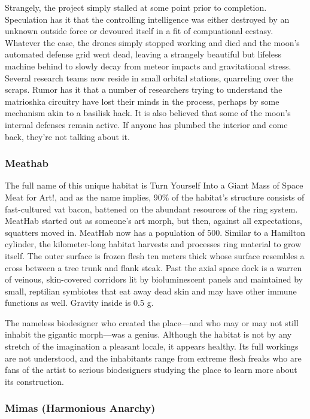Strangely, the project simply stalled at some point prior to completion. Speculation has it that the controlling intelligence was either destroyed by an unknown outside force or devoured itself in a fit of compuational ecstasy. Whatever the case, the drones simply stopped working and died and the moon's automated defense grid went dead, leaving a strangely beautiful but lifeless machine behind to slowly decay from meteor impacts and gravitational stress. Several research teams now reside in small orbital stations, quarreling over the scraps. Rumor has it that a number of researchers trying to understand the matrioshka circuitry have lost their minds in the process, perhaps by some mechanism akin to a basilisk hack. It is also believed that some of the moon's internal defenses remain active. If anyone has plumbed the interior and come back, they're not talking about it. 

\subsubsection{Meathab}
\label{sec:meathab} 

The full name of this unique habitat is Turn Yourself Into a Giant Mass of Space Meat for Art!, and as the name implies, 90\% of the habitat's structure consists of fast-cultured vat bacon, battened on the abundant resources of the ring system. MeatHab started out as someone's art morph, but then, against all expectations, squatters moved in. MeatHab now has a population of 500. Similar to a Hamilton cylinder, the kilometer-long habitat harvests and processes ring material to grow itself. The outer surface is frozen flesh ten meters thick whose surface resembles a cross between a tree trunk and flank steak. Past the axial space dock is a warren of veinous, skin-covered corridors lit by bioluminescent panels and maintained by small, reptilian symbiotes that eat away dead skin and may have other immune functions as well. Gravity inside is 0.5 g. 

The nameless biodesigner who created the place—and who may or may not still inhabit the gigantic morph—was a genius. Although the habitat is not by any stretch of the imagination a pleasant locale, it appears healthy. Its full workings are not understood, and the inhabitants range from extreme flesh freaks who are fans of the artist to serious biodesigners studying the place to learn more about its construction. 

\subsubsection{Mimas (Harmonious Anarchy)}
\label{sec:mimas-harm-anarchy} 

